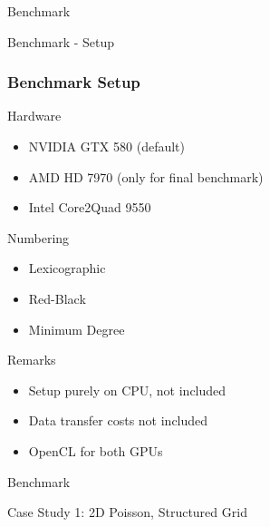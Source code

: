 

\begin{frame}{Benchmark}
 \begin{center}
  Benchmark - Setup
 \end{center}
\end{frame}

\begin{frame}[fragile]
\frametitle{Benchmark Setup}

     \begin{block}{Hardware}
       \begin{itemize}
         \item NVIDIA GTX 580 (default)
         \item AMD HD 7970 (only for final benchmark)
         \item Intel Core2Quad 9550
       \end{itemize}
     \end{block}

     \begin{block}{Numbering}
      \begin{itemize}
        \item Lexicographic
        \item Red-Black
        \item Minimum Degree
      \end{itemize}
    \end{block}

     \begin{block}{Remarks}
      \begin{itemize}
        \item Setup purely on CPU, not included
        \item Data transfer costs not included
        \item OpenCL for both GPUs
      \end{itemize}
    \end{block}

\end{frame}


\begin{frame}{Benchmark}
 \begin{center}
  Case Study 1: 2D Poisson, Structured Grid
 \end{center}
\end{frame}

